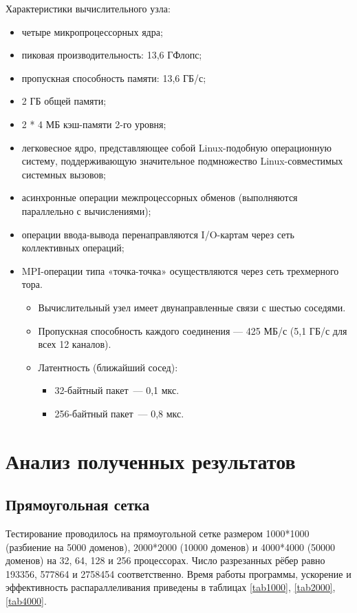 \documentclass[oneside,final,14pt]{extreport}
\begin{document}
Характеристики вычислительного узла:

\begin{itemize}
    \item четыре микропроцессорных ядра;
    \item пиковая производительность: 13,6 ГФлопс;
    \item пропускная способность памяти: 13,6 ГБ/с;
    \item 2 ГБ общей памяти;
    \item 2 * 4 МБ кэш-памяти 2-го уровня;
    \item легковесное ядро, представляющее собой Linux-подобную операционную систему,
        поддерживающую значительное подмножество Linux-совместимых системных вызовов;
    \item асинхронные операции межпроцессорных обменов (выполняются параллельно с вычислениями);
    \item операции ввода-вывода перенаправляются I/O-картам через сеть коллективных операций;
    \item MPI-операции типа «точка-точка» осуществляются через сеть трехмерного тора.
        \begin{itemize}
            \item Вычислительный узел имеет двунаправленные связи с шестью соседями.
            \item Пропускная способность каждого соединения — 425 МБ/с (5,1 ГБ/с для всех 12
        каналов).
            \item Латентность (ближайший сосед):
                \begin{itemize}
                    \item 32-байтный пакет~--- 0,1 мкс.
                    \item 256-байтный пакет~--- 0,8 мкс.
                \end{itemize}
        \end{itemize}
\end{itemize}


\chapter*{Анализ полученных результатов}

\section*{Прямоугольная сетка}

Тестирование проводилось на прямоугольной сетке размером
1000*1000 (разбиение на 5000 доменов), 2000*2000 (10000 доменов) и
4000*4000 (50000 доменов) на 32, 64, 128 и 256 процессорах. Число разрезанных
рёбер равно 193356, 577864 и
2758454 соответственно. Время работы программы, ускорение и эффективность
распараллеливания приведены в таблицах \ref{tab1000}, \ref{tab2000},
\ref{tab4000}.
\end{document}
